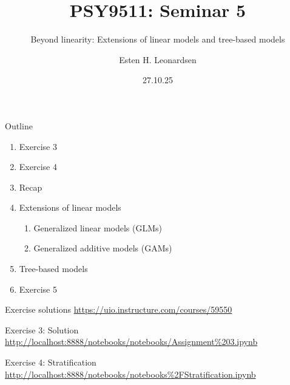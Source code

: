 \documentclass{beamer}
\title{PSY9511: Seminar 5}
\subtitle{Beyond linearity: Extensions of linear models and tree-based models}
\author{Esten H. Leonardsen}
\date{27.10.25}
\begin{document}
	\begin{frame}
	 	\maketitle
	\end{frame}

    \begin{frame}{Outline}
        \begin{enumerate}
            \item Exercise 3
            \item Exercise 4
            \item Recap
            \item Extensions of linear models
            \begin{enumerate}
                \item Generalized linear models (GLMs)
                \item Generalized additive models (GAMs)
            \end{enumerate}
            \item Tree-based models
            \item Exercise 5
        \end{enumerate}
    \end{frame}

    \begin{frame}{Exercise solutions}
        \centering
        \vfill
        \small{\url{https://uio.instructure.com/courses/59550}}
        \vfill
    \end{frame}

    \begin{frame}{Exercise 3: Solution}
        \centering
        \vfill
        \scriptsize{\url{http://localhost:8888/notebooks/notebooks/Assignment\%203.ipynb}}
        \vfill
    \end{frame}

    \begin{frame}{Exercise 4: Stratification}
        \centering
        \vfill
        \scriptsize{\url{http://localhost:8888/notebooks/notebooks\%2FStratification.ipynb}}
        \vfill
    \end{frame}
\end{document}

